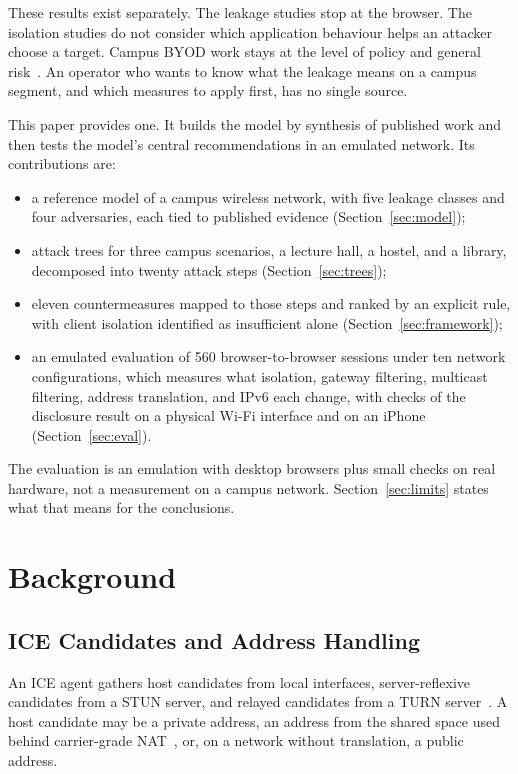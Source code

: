 \documentclass[conference]{IEEEtran}
\begin{document}
These results exist separately. The leakage studies stop at the browser. The isolation studies do not consider which application behaviour helps an attacker choose a target. Campus BYOD work stays at the level of policy and general risk~\cite{tchao2017}. An operator who wants to know what the leakage means on a campus segment, and which measures to apply first, has no single source.

This paper provides one. It builds the model by synthesis of published work and then tests the model's central recommendations in an emulated network. Its contributions are:
\begin{itemize}
\item a reference model of a campus wireless network, with five leakage classes and four adversaries, each tied to published evidence (Section~\ref{sec:model});
\item attack trees for three campus scenarios, a lecture hall, a hostel, and a library, decomposed into twenty attack steps (Section~\ref{sec:trees});
\item eleven countermeasures mapped to those steps and ranked by an explicit rule, with client isolation identified as insufficient alone (Section~\ref{sec:framework});
\item an emulated evaluation of 560 browser-to-browser sessions under ten network configurations, which measures what isolation, gateway filtering, multicast filtering, address translation, and IPv6 each change, with checks of the disclosure result on a physical Wi-Fi interface and on an iPhone (Section~\ref{sec:eval}).
\end{itemize}
The evaluation is an emulation with desktop browsers plus small checks on real hardware, not a measurement on a campus network. Section~\ref{sec:limits} states what that means for the conclusions.

\section{Background}
\label{sec:background}
\subsection{ICE Candidates and Address Handling}
An ICE agent gathers host candidates from local interfaces, server-reflexive candidates from a STUN server, and relayed candidates from a TURN server~\cite{rfc8445,rfc8489}. A host candidate may be a private address, an address from the shared space used behind carrier-grade NAT~\cite{rfc6598}, or, on a network without translation, a public address.
\end{document}
